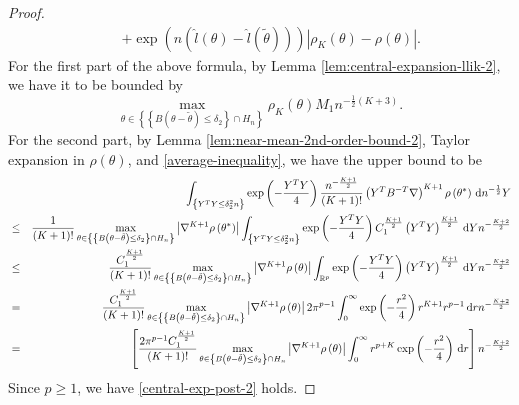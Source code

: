 \begin{proof}
\begin{eqnarray*}
 &  & +\exp\left(n\left(\hat{l}\left(\theta\right)-\hat{l}\left(\tilde{\theta}\right)\right)\right)\left|\rho_{K}\left(\theta\right)-\rho\left(\theta\right)\right|.
\end{eqnarray*}
For the first part of the above formula, by Lemma \ref{lem:central-expansion-llik-2},
we have it to be bounded by 
\[
\max_{\theta\in\left\{ \left\{ B\left(\theta-\tilde{\theta}\right)\le\delta_{2}\right\} \cap H_{n}\right\} }\rho_{K}\left(\theta\right)M_{1}n^{-\frac{1}{2}\left(K+3\right)}.
\]
For the second part, by Lemma \ref{lem:near-mean-2nd-order-bound-2}, Taylor
expansion in $\rho\left(\theta\right)$, and \eqref{average-inequality},
we have the upper bound to be 
\begin{eqnarray*}
 &  & \int_{\left\{ Y^{T}Y\le\delta_{2}^{2}n\right\} }\exp\left(-\frac{Y^{T}Y}{4}\right)\frac{n^{-\frac{K+1}{2}}}{\left(K+1\right)!}\left(Y^{T}B^{-T}\nabla\right)^{K+1}\rho\left(\theta^{*}\right)\,\mathrm{d} n^{-\frac{1}{2}}Y\\
 & \le & \frac{1}{\left(K+1\right)!}\max_{\theta\in\left\{ \left\{ B\left(\theta-\tilde{\theta}\right)\le\delta_{2}\right\} \cap H_{n}\right\} }\left|\nabla^{K+1}\rho\left(\theta^{*}\right)\right|\int_{\left\{ Y^{T}Y\le\delta_{2}^{2}n\right\} }\exp\left(-\frac{Y^{T}Y}{4}\right)C_{1}^{\frac{K+1}{2}}\left(Y^{T}Y\right)^{\frac{K+1}{2}}\,\mathrm{d} Yn^{-\frac{K+2}{2}}\\
 & \le & \frac{C_{1}^{\frac{K+1}{2}}}{\left(K+1\right)!}\max_{\theta\in\left\{ \left\{ B\left(\theta-\tilde{\theta}\right)\le\delta_{2}\right\} \cap H_{n}\right\} }\left|\nabla^{K+1}\rho\left(\theta\right)\right|\int_{\mathbb{R}^{p}}\exp\left(-\frac{Y^{T}Y}{4}\right)\left(Y^{T}Y\right)^{\frac{K+1}{2}}\,\mathrm{d} Yn^{-\frac{K+2}{2}}\\
 & = & \frac{C_{1}^{\frac{K+1}{2}}}{\left(K+1\right)!}\max_{\theta\in\left\{ \left\{ B\left(\theta-\tilde{\theta}\right)\le\delta_{2}\right\} \cap H_{n}\right\} }\left|\nabla^{K+1}\rho\left(\theta\right)\right|2\pi^{p-1}\int_{0}^{\infty}\exp\left(-\frac{r^{2}}{4}\right)r^{K+1}r^{p-1}\,\mathrm{d} rn^{-\frac{K+2}{2}}\\
 & = & \left[\frac{2\pi^{p-1}C_{1}^{\frac{K+1}{2}}}{\left(K+1\right)!}\max_{\theta\in\left\{ B\left(\theta-\tilde{\theta}\right)\le\delta_{2}\right\} \cap H_{n}}\left|\nabla^{K+1}\rho\left(\theta\right)\right|\int_{0}^{\infty}r^{p+K}\exp\left(-\frac{r^{2}}{4}\right)\,\mathrm{d} r\right]n^{-\frac{K+2}{2}}
\end{eqnarray*}
Since $p\ge1$, we have \eqref{central-exp-post-2} holds.

\end{proof}

